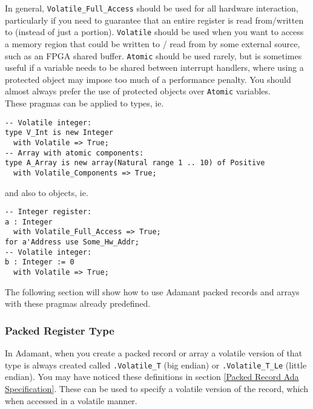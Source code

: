In general, \texttt{Volatile\_Full\_Access} should be used for all hardware interaction, particularly if you need to guarantee that an entire register is read from/written to (instead of just a portion). \texttt{Volatile} should be used when you want to access a memory region that could be written to / read from by some external source, such as an FPGA shared buffer. \texttt{Atomic} should be used rarely, but is sometimes useful if a variable needs to be shared between interrupt handlers, where using a protected object may impose too much of a performance penalty. You should almost always prefer the use of protected objects over \texttt{Atomic} variables. \\

These pragmas can be applied to types, ie.

\vspace{5mm} %
\begin{verbatim}
-- Volatile integer:
type V_Int is new Integer 
  with Volatile => True;
-- Array with atomic components:
type A_Array is new array(Natural range 1 .. 10) of Positive 
  with Volatile_Components => True;
\end{verbatim}
\vspace{5mm} %

and also to objects, ie.

\vspace{5mm} %
\begin{verbatim}
-- Integer register:
a : Integer 
  with Volatile_Full_Access => True;
for a'Address use Some_Hw_Addr;
-- Volatile integer:
b : Integer := 0 
  with Volatile => True;
\end{verbatim}
\vspace{5mm} %

The following section will show how to use Adamant packed records and arrays with these pragmas already predefined.

\subsubsection{Packed Register Type}

In Adamant, when you create a packed record or array a volatile version of that type is always created called \texttt{.Volatile\_T} (big endian) or \texttt{.Volatile\_T\_Le} (little endian). You may have noticed these definitions in section \ref{Packed Record Ada Specification}. These can be used to specify a volatile version of the record, which when accessed in a volatile manner. \\

